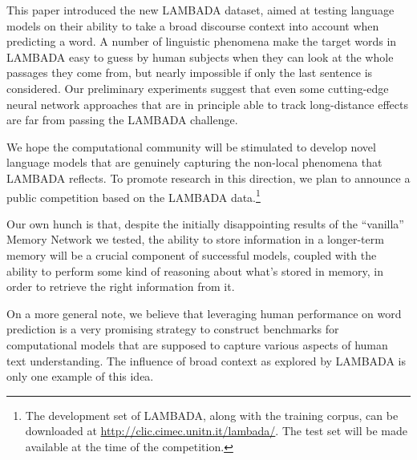 This paper introduced the new LAMBADA dataset, aimed at testing language models on their ability to take a broad discourse context into account when predicting a word. A number of linguistic phenomena make the target words in LAMBADA easy to guess by human subjects when they can look at the whole passages they come from, but nearly impossible if only the last sentence is considered. Our preliminary experiments suggest that even some cutting-edge neural network approaches that are in principle able to track long-distance effects are far from passing the LAMBADA challenge.

We hope the computational community will be stimulated to develop novel language models that are genuinely capturing the non-local phenomena that LAMBADA reflects. To promote research in this direction, we plan to announce a public competition based on the LAMBADA data.\footnote{The development set of LAMBADA, along with the training corpus, can be downloaded at \url{http://clic.cimec.unitn.it/lambada/}. The test set will be made available at the time of the competition.}

Our own hunch is that, despite the initially disappointing results of the ``vanilla'' Memory Network we tested, the ability to store information in a longer-term memory will be a crucial component of successful models, coupled with the ability to perform some kind of reasoning about what's stored in memory, in order to retrieve the right information from it.

On a more general note, we believe that leveraging human performance on word prediction is a very promising strategy to construct benchmarks for computational models that are supposed to capture various aspects of human text understanding. The influence of broad context as explored by LAMBADA is only one example of this idea.



